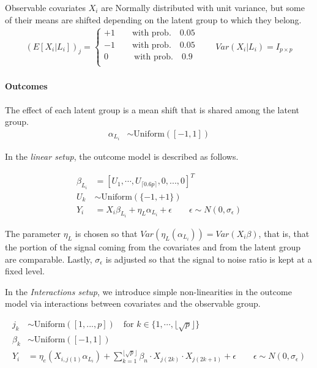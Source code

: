 \documentclass{article}
\theoremstyle{plain}
\theoremstyle{definition}
\theoremstyle{remark}
\begin{document}
Observable covariates $X_{i}$ are Normally distributed with unit variance, but some of their means are shifted depending on the latent group to which they belong.
\begin{align}
    (E[X_{i} | L_{i}])_{j} = \begin{cases}
        +1 \qquad \text{with prob.}\quad 0.05 \\
        -1 \qquad \text{with prob.}\quad 0.05 \\
        0 \qquad \quad \text{with prob.}\quad 0.9 \\
    \end{cases}
    \qquad
    Var(X_{i}|L_{i}) = I_{p \times p}
\end{align}

\paragraph{Outcomes}
The effect of each latent group is a mean shift that is shared among the latent group.
\begin{align}
    \alpha_{L_{i}} &\sim \text{Uniform}([-1, 1])
\end{align}

\noindent In the \emph{linear setup}, the outcome model is described as follows.

\begin{align}
  \beta_{L_{i}} &= [U_1, \cdots, U_{\lceil 0.6p \rceil}, 0,...,0 ]^{T} \\
  U_{k} &\sim \text{Uniform} (\{ -1, +1 \}) \\
  Y_{i} &= X_{i}\beta_{L_{i}} + \eta_{L}\alpha_{L_i} + \epsilon
  \qquad \epsilon \sim N(0,\sigma_{\epsilon})
  \label{eq:linear_dgp}
\end{align}

\noindent  The parameter $\eta_{L}$ is chosen so that  $Var(\eta_{L}(\alpha_{L_i})) = Var(X_{i}\beta)$, that is, that the portion of the signal coming from the covariates and from the latent group are comparable. Lastly, $\sigma_{\epsilon}$ is adjusted so that the signal to noise ratio is kept at a fixed level.

In the \emph{Interactions setup}, we introduce simple non-linearities in the outcome model via interactions between covariates and the observable group.

\begin{align}
    j_k &\sim \text{Uniform}([1,...,p]) \quad \text{for } k \in \{1, \cdots, \lfloor \sqrt{p} \rfloor \}   \\
    \beta_k &\sim \text{Uniform}([-1,1]) \\
    Y_{i} &=
    \eta_{e} (X_{i,j(1)} \alpha_{L_{i}}) +
    \sum_{k=1}^{\lfloor \sqrt{p} \rfloor} \beta_n \cdot X_{j(2k)} \cdot X_{j(2k+1)} +  \epsilon \qquad \epsilon \sim N(0, \sigma_{\epsilon})
    \label{eq:interactions_dgp}
\end{align}
\end{document}
